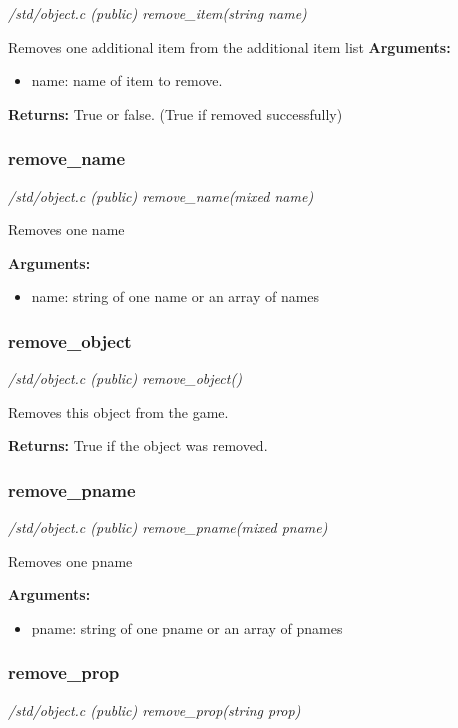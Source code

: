 {\em /std/object.c (public) remove\_item(string name)}

Removes one additional item from the additional item list
{\bf Arguments:}
\begin{itemize}
\item     name: name of item to remove.
\end{itemize}

{\bf Returns:}    True or false. (True if removed successfully)


\subsubsection{remove\_name}

{\em /std/object.c (public) remove\_name(mixed name)}

Removes one name

{\bf Arguments:}
\begin{itemize}
\item     name: string of one name or an array of names
\end{itemize}


\subsubsection{remove\_object}

{\em /std/object.c (public) remove\_object()}

Removes this object from the game.

{\bf Returns:}        True if the object was removed.


\subsubsection{remove\_pname}

{\em /std/object.c (public) remove\_pname(mixed pname)}

Removes one pname

{\bf Arguments:}
\begin{itemize}
\item     pname: string of one pname or an array of pnames
\end{itemize}


\subsubsection{remove\_prop}

{\em /std/object.c (public) remove\_prop(string prop)}

